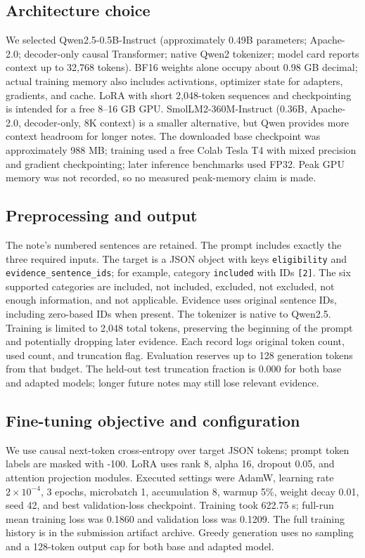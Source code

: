 \documentclass[conference]{IEEEtran}
\begin{document}
\subsection{Architecture choice}
We selected Qwen2.5-0.5B-Instruct (approximately 0.49B parameters; Apache-2.0; decoder-only causal Transformer; native Qwen2 tokenizer; model card reports context up to 32,768 tokens). BF16 weights alone occupy about 0.98 GB decimal; actual training memory also includes activations, optimizer state for adapters, gradients, and cache. LoRA with short 2,048-token sequences and checkpointing is intended for a free 8--16 GB GPU. SmolLM2-360M-Instruct (0.36B, Apache-2.0, decoder-only, 8K context) is a smaller alternative, but Qwen provides more context headroom for longer notes. The downloaded base checkpoint was approximately 988 MB; training used a free Colab Tesla T4 with mixed precision and gradient checkpointing; later inference benchmarks used FP32. Peak GPU memory was not recorded, so no measured peak-memory claim is made.
\subsection{Preprocessing and output}
The note's numbered sentences are retained. The prompt includes exactly the three required inputs. The target is a JSON object with keys \texttt{eligibility} and \texttt{evidence\_sentence\_ids}; for example, category \texttt{included} with IDs \texttt{[2]}. The six supported categories are included, not included, excluded, not excluded, not enough information, and not applicable. Evidence uses original sentence IDs, including zero-based IDs when present. The tokenizer is native to Qwen2.5. Training is limited to 2,048 total tokens, preserving the beginning of the prompt and potentially dropping later evidence. Each record logs original token count, used count, and truncation flag. Evaluation reserves up to 128 generation tokens from that budget. The held-out test truncation fraction is 0.000 for both base and adapted models; longer future notes may still lose relevant evidence.
\subsection{Fine-tuning objective and configuration}
We use causal next-token cross-entropy over target JSON tokens; prompt token labels are masked with -100. LoRA uses rank 8, alpha 16, dropout 0.05, and attention projection modules. Executed settings were AdamW, learning rate $2\times10^{-4}$, 3 epochs, microbatch 1, accumulation 8, warmup 5\%, weight decay 0.01, seed 42, and best validation-loss checkpoint. Training took 622.75 s; full-run mean training loss was 0.1860 and validation loss was 0.1209. The full training history is in the submission artifact archive. Greedy generation uses no sampling and a 128-token output cap for both base and adapted model.
\end{document}
